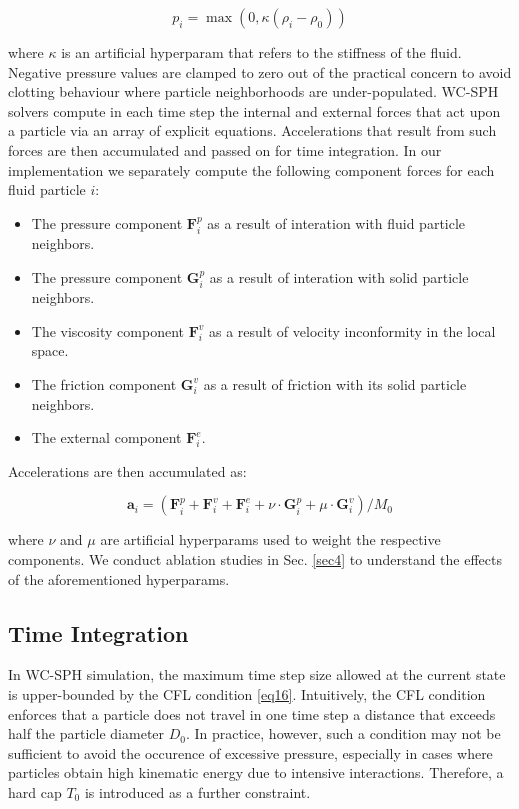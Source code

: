 \documentclass[
	11pt, 
	DIV10,
	ngerman,
	a4paper, 
	oneside, 
	headings=normal, 
	captions=tableheading,
	final, 
	numbers=noenddot
]{scrartcl}
\begin{document}
\begin{equation}
	\label{eq14}
    p_{i} = \max(0, \kappa(\rho_{i} - \rho_{0}))
\end{equation}

where $ \kappa $ is an artificial hyperparam that refers to the stiffness of the fluid. Negative pressure values are clamped to zero out of the practical concern to avoid clotting behaviour where particle neighborhoods are under-populated. WC-SPH solvers compute in each time step the internal and external forces that act upon a particle via an array of explicit equations. Accelerations that result from such forces are then accumulated and passed on for time integration. In our implementation we separately compute the following component forces for each fluid particle $ i $:

\begin{itemize}
    \item The pressure component $ \mathbf{F}_{i}^{p} $ as a result of interation with fluid particle neighbors.
    \item The pressure component $ \mathbf{G}_{i}^{p} $ as a result of interation with solid particle neighbors.
    \item The viscosity component $ \mathbf{F}_{i}^{v} $ as a result of velocity inconformity in the local space.
    \item The friction component $ \mathbf{G}_{i}^{v} $ as a result of friction with its solid particle neighbors.
    \item The external component $ \mathbf{F}_{i}^{e} $.
\end{itemize}

Accelerations are then accumulated as:

\begin{equation}
	\label{eq15}
	\boldsymbol{a}_{i} = \left(\mathbf{F}_{i}^{p} + \mathbf{F}_{i}^{v} + \mathbf{F}_{i}^{e} + \nu \cdot \mathbf{G}_{i}^{p} + \mu \cdot \mathbf{G}_{i}^{v} \right) / M_{0}
\end{equation}

where $ \nu $ and $ \mu $ are artificial hyperparams used to weight the respective components. We conduct ablation studies in Sec. \ref{sec4} to understand the effects of the aforementioned hyperparams.

\subsection{Time Integration}

In WC-SPH simulation, the maximum time step size allowed at the current state is upper-bounded by the CFL condition \eqref{eq16}. Intuitively, the CFL condition enforces that a particle does not travel in one time step a distance that exceeds half the particle diameter $ D_{0} $. In practice, however, such a condition may not be sufficient to avoid the occurence of excessive pressure, especially in cases where particles obtain high kinematic energy due to intensive interactions. Therefore, a hard cap $ T_{0} $ is introduced as a further constraint.
\end{document}

